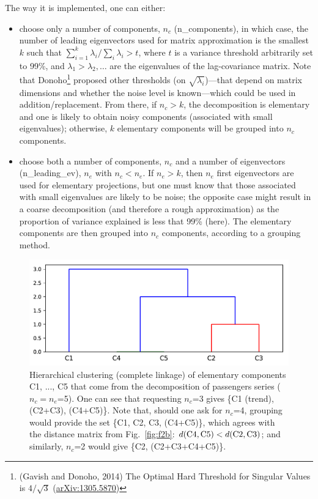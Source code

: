 \documentclass{article}
\begin{document}
The way it is implemented, one can either:
\begin{itemize}
  \item choose only a number of components, $n_c$ ({\selectfont n\_components}), in which case, the number of leading eigenvectors used for matrix approximation is the smallest $k$ such that $\sum_{i=1}^{k}\lambda_i / \sum_{i}\lambda_i>t$, where $t$ is a variance threshold arbitrarily set to 99\%, and $\lambda_1>\lambda_2,\dots$ are the eigenvalues of the lag-covariance matrix. Note that Donoho\footnote{(Gavish and Donoho, 2014) The Optimal Hard Threshold for Singular Values is $4/\sqrt{3}$ (\href{https://www.arxiv.org/abs/1305.5870}{arXiv:1305.5870})} proposed other thresholds (on $\sqrt{\lambda_i}$)---that depend on matrix dimensions and whether the noise level is known---which could be used in addition/replacement. From there, if $n_c>k$, the decomposition is elementary and one is likely to obtain noisy components (associated with small eigenvalues); otherwise, $k$ elementary components will be grouped into $n_c$ components.
  \item choose both a number of components, $n_c$ and a number of eigenvectors ({\selectfont n\_leading\_ev}), $n_e$ with $n_c<n_e$. If $n_e>k$, then $n_e$ first eigenvectors are used for elementary projections, but one must know that those associated with small eigenvalues are likely to be noise; the opposite case might result in a coarse decomposition (and therefore a rough approximation) as the proportion of variance explained is less that 99\% (here). The elementary components are then grouped into $n_c$ components, according to a grouping method.
\end{itemize}



\begin{figure}
  \centering
  \includegraphics[scale=0.4]{figures/fig3}
  \caption{Hierarchical clustering (complete linkage) of elementary components C1, ..., C5 that come from the decomposition of passengers series ($n_c=n_e$=5). One can see that requesting $n_c$=3 gives \{C1 (trend), (C2+C3), (C4+C5)\}. Note that, should one ask for $n_c$=4, grouping would provide the set \{C1, C2, C3, (C4+C5)\}, which agrees with the distance matrix from Fig.~\ref{fig:f2b}: $d(\textmd{C4}, \textmd{C5})<d(\textmd{C2}, \textmd{C3})$; and similarly, $n_c$=2 would give \{C2, (C2+C3+C4+C5)\}.}
  \label{fig:f2}
\end{figure}
\end{document}
